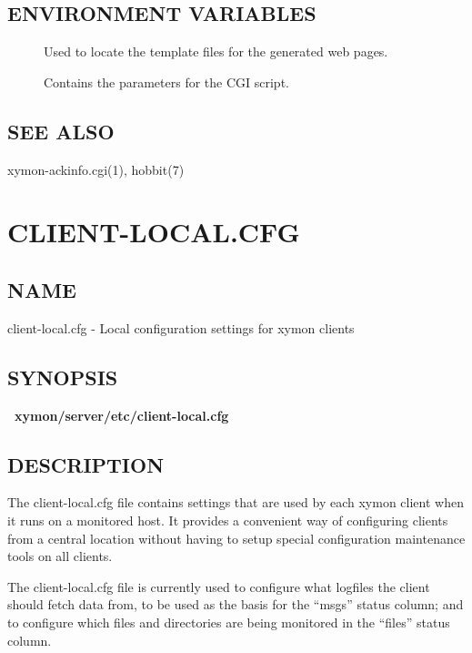 \subsection{ENVIRONMENT VARIABLES}
\begin{description}
\item[] Used to locate the template files for the generated web pages. 

 

\item[] Contains the parameters for the CGI script. 

 


\end{description}
\subsection{SEE ALSO}
xymon-ackinfo.cgi(1), hobbit(7) 

  
%
\newpage
\section{CLIENT-LOCAL.CFG}
\subsection{NAME}
 client-local.cfg - Local configuration settings for xymon clients 

 
\subsection{SYNOPSIS}
\textbf{~xymon/server/etc/client-local.cfg}


 
\subsection{DESCRIPTION}
 The client-local.cfg file contains settings that are used by each
 xymon client when it runs on a monitored host. It provides a
 convenient way of configuring clients from a central location without
 having to setup special configuration maintenance tools on all
 clients. 


  The client-local.cfg file is currently used to configure what logfiles the client should fetch data from, to be used as the basis for the ``msgs'' status column; and to configure which files and directories are being monitored in the ``files'' status column. 


